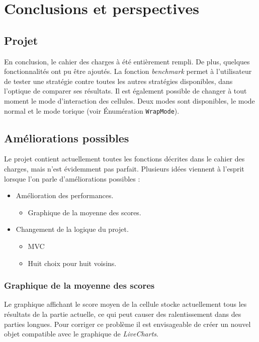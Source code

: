 \documentclass[a4paper, french]{article}
\begin{document}
\section{Conclusions et perspectives}
\subsection{Projet}
En conclusion, le cahier des charges à été entièrement rempli. De plus, quelques fonctionnalités ont pu être ajoutés. La fonction \textit{benchmark} permet à l'utilisateur de tester une stratégie contre toutes les autres stratégies disponibles, dans l'optique de comparer ses résultats. Il est également possible de changer à tout moment le mode d'interaction des cellules. Deux modes sont disponibles, le mode normal et le mode torique (voir Énumération \texttt{WrapMode}). 

\subsection{Améliorations possibles}
Le projet contient actuellement toutes les fonctions décrites dans le cahier des charges, mais n'est évidemment pas parfait. Plusieurs idées viennent à l'esprit lorsque l'on parle d'améliorations possibles :

\begin{itemize}
    \item Amélioration des performances.
    \begin{itemize}
        \item Graphique de la moyenne des scores.
    \end{itemize}
    
    \item Changement de la logique du projet.
    \begin{itemize}
        \item MVC
        \item Huit choix pour huit voisins.
    \end{itemize}
\end{itemize}


\pagebreak
\subsubsection{Graphique de la moyenne des scores}
Le graphique affichant le score moyen de la cellule stocke actuellement tous les résultats de la partie actuelle, ce qui peut causer des ralentissement dans des parties longues. Pour corriger ce problème il est envisageable de créer un nouvel objet compatible avec le graphique de \textit{LiveCharts}. 
\end{document}
